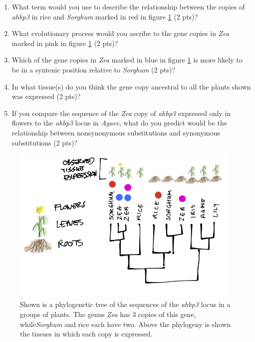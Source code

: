 \documentclass[]{article}
\begin{document}
\begin{enumerate}
\begin{enumerate}
\item What term would you use to describe the relationship between the copies of \emph{ahbp3} in rice and \emph{Sorghum} marked in red in figure \ref{duplicates}  (2 pts)? 
\item What evolutionary process would you ascribe to the gene copies in  \emph{Zea} marked in pink in figure \ref{duplicates} (2 pts)?
\item Which of the gene copies in \emph{Zea} marked in blue in figure \ref{duplicates} is more likely to be in a syntenic position relative to \emph{Sorghum} (2 pts)?
\item In what tissue(s) do you think the gene copy ancestral to all the plants shown was expressed (2 pts)?
\item If you compare the sequence of the \emph{Zea }copy of \emph{ahbp3} expressed only in flowers to the \emph{ahbp3} locus in \emph{Agave}, what do you predict would be the relationship between nonsynonymous substitutions and synonymous substitutions (2 pts)?
\end{enumerate}

\begin{figure}[h]
  \begin{center}
   \includegraphics[width=110mm]{images/examfig2.png}
    \caption{Shown is a phylogenetic tree of the sequences of the \emph{ahbp3} locus in a groups of plants. The genus \emph{Zea} has 3 copies of this gene, while\emph{Sorghum} and rice each have two. Above the phylogeny is shown the tissues in which each copy is expressed. } 
\label{duplicates}
  \end{center}
\end{figure}


\end{enumerate}
\end{document}
